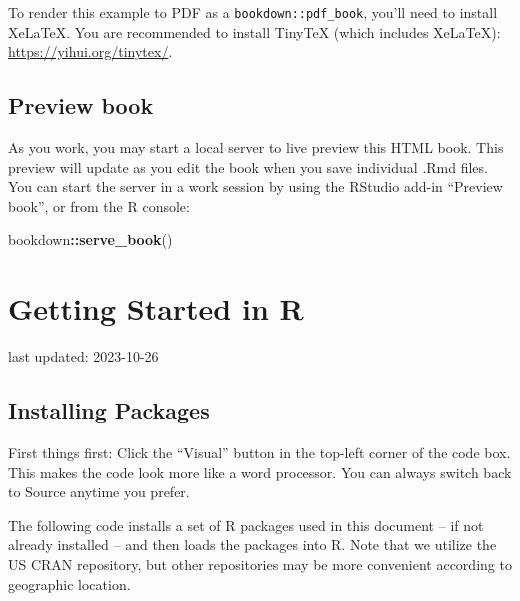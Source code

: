 \documentclass[
]{book}
\newenvironment{Shaded}{\begin{snugshade}}{\end{snugshade}}
\newcommand{\FunctionTok}[1]{\textcolor[rgb]{0.13,0.29,0.53}{\textbf{#1}}}
\newcommand{\NormalTok}[1]{#1}
\newcommand{\SpecialCharTok}[1]{\textcolor[rgb]{0.81,0.36,0.00}{\textbf{#1}}}
\theoremstyle{definition}
\theoremstyle{definition}
\theoremstyle{definition}
\theoremstyle{definition}
\theoremstyle{remark}
\begin{document}
To render this example to PDF as a \texttt{bookdown::pdf\_book}, you'll need to install XeLaTeX. You are recommended to install TinyTeX (which includes XeLaTeX): \url{https://yihui.org/tinytex/}.

\hypertarget{preview-book}{%
\section{Preview book}\label{preview-book}}

As you work, you may start a local server to live preview this HTML book. This preview will update as you edit the book when you save individual .Rmd files. You can start the server in a work session by using the RStudio add-in ``Preview book'', or from the R console:

\begin{Shaded}
\begin{Highlighting}[]
\NormalTok{bookdown}\SpecialCharTok{::}\FunctionTok{serve\_book}\NormalTok{()}
\end{Highlighting}
\end{Shaded}

\hypertarget{getting-started-in-r}{%
\chapter{Getting Started in R}\label{getting-started-in-r}}

last updated: 2023-10-26

\hypertarget{installing-packages}{%
\section{Installing Packages}\label{installing-packages}}

First things first: Click the ``Visual'' button in the top-left corner of the code box. This makes the code look more like a word processor. You can always switch back to Source anytime you prefer.

The following code installs a set of R packages used in this document -- if not already installed -- and then loads the packages into R. Note that we utilize the US CRAN repository, but other repositories may be more convenient according to geographic location.
\end{document}
